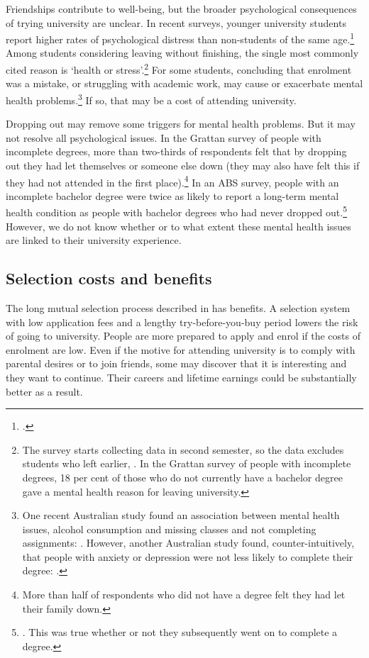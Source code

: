 Friendships contribute to well-being, but the broader psychological consequences of trying university are unclear. In recent surveys, younger university students report higher rates of psychological distress than non-students of the same age.\footcite[][]{Cvetkovski2012} 
Among students considering leaving without finishing, the single most commonly cited reason is `health or stress'.\footnote{The survey starts collecting data in second semester, so the data excludes students who left earlier, \textcite[][12]{SocialResearchCentre/DepartmentofEducationandTraining2017}. In the Grattan survey of people with incomplete degrees, 18 per cent of those who do not currently have a bachelor degree gave a mental health reason for leaving university.} 
For some students, concluding that enrolment was a mistake, or struggling with academic work, may cause or exacerbate mental health problems.\footnote{One recent Australian study found an association between mental health issues, alcohol consumption and missing classes and not completing assignments: \textcite{Tembo2017}. However, another Australian study found, counter-intuitively, that people with anxiety or depression were not less likely to complete their degree: \textcite{Cvetkovski2018}.} If so, that may be a cost of attending university.

Dropping out may remove some triggers for mental health problems. But it may not resolve all psychological issues. In the Grattan survey of people with incomplete degrees, more than two-thirds of respondents felt that by dropping out they had let themselves or someone else down (they may also have felt this if they had not attended in the first place).\footnote{More than half of respondents who did not have a degree felt they had let their family down.} 
In an ABS survey, people with an incomplete bachelor degree were twice as likely to report a long-term mental health condition as people with bachelor degrees who had never dropped out.\footnote{\textcite{ABS2016f}. This was true whether or not they subsequently went on to complete a degree.} However, we do not know whether or to what extent these mental health issues are linked to their university experience.


\subsection{Selection costs and benefits }\label{subsec:2.1.4}

The long mutual selection process described in  has benefits. A selection system with low application fees and a lengthy try-before-you-buy period lowers the risk of going to university. People are more prepared to apply and enrol if the costs of enrolment are low. Even if the motive for attending university is to comply with parental desires or to join friends, some may discover that it is interesting and they want to continue. Their careers and lifetime earnings could be substantially better as a result.

